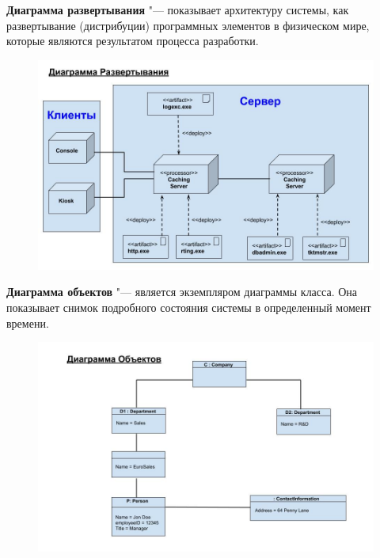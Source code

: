 \documentclass[bachelor, och, pract]{SCWorks}
\theoremstyle{remark}
\begin{document}
    \newpage
    \textbf{Диаграмма развертывания} "--- показывает архитектуру системы, как развертывание (дистрибуции) программных элементов в физическом мире, которые являются результатом процесса разработки.

    \begin{figure}[H]
        \begin{center}
            \includegraphics[scale=0.5]{res/deployment-diagram.png}
        \end{center}
    \end{figure}

    \newpage
    \textbf{Диаграмма объектов} "--- является экземпляром диаграммы класса. Она показывает снимок подробного состояния системы в определенный момент времени.

    \begin{figure}[H]
        \begin{center}
            \includegraphics[scale=0.5]{res/object-diagram.png}
        \end{center}
    \end{figure}
\end{document}
